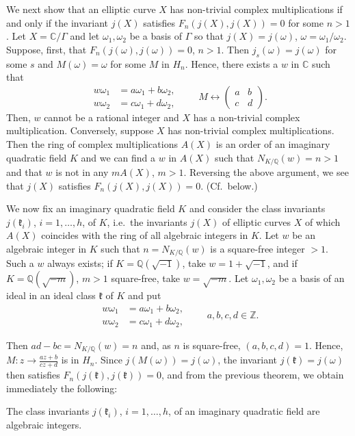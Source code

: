 We next show that an elliptic curve $X$ has non-trivial complex
multiplications if and only if the invariant $j(X)$ satisfies
$F_{n}(j(X),j(X))=0$ for some $n>1$. Let $X=\mathbb{C}/\Gamma$ and let
$\omega_{1},\omega_{2}$ be a basis of $\Gamma$ so that $j(X)=j(\omega)$,
$\omega=\omega_{1}/\omega_{2}$. Suppose, first, that
$F_{n}(j(\omega),j(\omega))=0$, $n>1$. Then $j_{s}(\omega)=j(\omega)$ for
some $s$ and $M(\omega)=\omega$ for some $M$ in $H_{n}$. Hence, there
exists a $w$ in $\mathbb{C}$ such that
\[
\begin{aligned}
w\omega_{1}&=a\omega_{1}+b\omega_{2},\\
w\omega_{2}&=c\omega_{1}+d\omega_{2},
\end{aligned}
\qquad
M\leftrightarrow
\begin{pmatrix}a&b\\ c&d\end{pmatrix}.
\]
Then, $w$ cannot be a rational integer and $X$ has a non-trivial complex
multiplication. Conversely, suppose $X$ has non-trivial complex
multiplications. Then the ring of complex multiplications $A(X)$ is an
order of an imaginary quadratic field $K$ and we can find a $w$ in $A(X)$
such that $N_{K/\mathbb{Q}}(w)=n>1$ and that $w$ is not in any
$mA(X)$, $m>1$. Reversing the above argument, we see that $j(X)$ satisfies
$F_{n}(j(X),j(X))=0$. (Cf.\ below.)

We now fix an imaginary quadratic field $K$ and consider the class
invariants $j(\mathfrak{k}_{i})$, $i=1,\ldots,h$, of $K$, i.e.\ the
invariants $j(X)$ of elliptic curves $X$ of which $A(X)$ coincides with
the ring of all algebraic integers in $K$. Let $w$ be an algebraic integer
in $K$ such that $n=N_{K/\mathbb{Q}}(w)$ is a square-free integer $>1$.
Such a $w$ always exists; if $K=\mathbb{Q}(\sqrt{-1})$, take
$w=1+\sqrt{-1}$, and if $K=\mathbb{Q}(\sqrt{-m})$, $m>1$ square-free, take
$w=\sqrt{-m}$. Let $\omega_{1},\omega_{2}$ be a basis of an ideal in an
ideal class $\mathfrak{k}$ of $K$ and put
\[
\begin{aligned}
w\omega_{1}&=a\omega_{1}+b\omega_{2},\\
w\omega_{2}&=c\omega_{1}+d\omega_{2},
\end{aligned}
\qquad a,b,c,d\in\mathbb{Z}.
\]

Then $ad-bc=N_{K/\mathbb{Q}}(w)=n$ and, as $n$ is square-free,
$(a,b,c,d)=1$. Hence,
$M:z\rightarrow\frac{az+b}{cz+d}$ is in $H_{n}$. Since
$j(M(\omega))=j(\omega)$, the invariant $j(\mathfrak{k})=j(\omega)$ then
satisfies $F_{n}(j(\mathfrak{k}),j(\mathfrak{k}))=0$, and from the
previous theorem, we obtain immediately the following:

\begin{theorem}\label{thm:III-2}
The class invariants $j(\mathfrak{k}_{i})$, $i=1,\ldots,h$, of an
imaginary quadratic field are algebraic integers.
\end{theorem}
